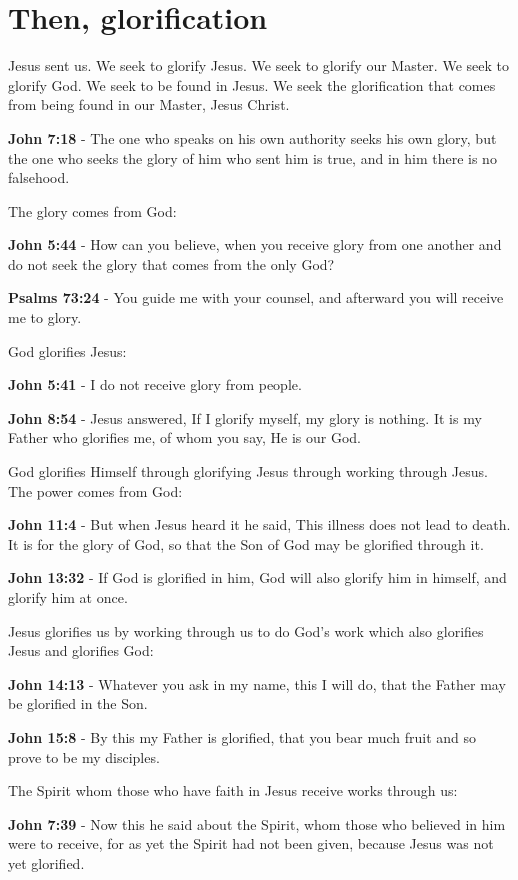 \documentclass[11pt]{article}
\begin{document}
\section{Then, glorification}
\label{sec:org25fc561}
Jesus sent us. We seek to glorify Jesus. We seek to glorify our Master.
We seek to glorify God. We seek to be found in Jesus. We seek the glorification that comes from being found in our Master, Jesus Christ.

\textbf{John 7:18} - The one who speaks on his own authority seeks his own glory, but the one who seeks the glory of him who sent him is true, and in him there is no falsehood.

The glory comes from God:

\textbf{John 5:44} - How can you believe, when you receive glory from one another and do not seek the glory that comes from the only God?

\textbf{Psalms 73:24} - You guide me with your counsel, and afterward you will receive me to glory.

God glorifies Jesus:

\textbf{John 5:41} - I do not receive glory from people.

\textbf{John 8:54} - Jesus answered, If I glorify myself, my glory is nothing. It is my Father who glorifies me, of whom you say, He is our God.

God glorifies Himself through glorifying Jesus through working through Jesus. The power comes from God:

\textbf{John 11:4} - But when Jesus heard it he said, This illness does not lead to death. It is for the glory of God, so that the Son of God may be glorified through it.

\textbf{John 13:32} - If God is glorified in him, God will also glorify him in himself, and glorify him at once.

Jesus glorifies us by working through us to do God's work which also glorifies Jesus and glorifies God:

\textbf{John 14:13} - Whatever you ask in my name, this I will do, that the Father may be glorified in the Son.

\textbf{John 15:8} - By this my Father is glorified, that you bear much fruit and so prove to be my disciples.

The Spirit whom those who have faith in Jesus receive works through us:

\textbf{John 7:39} - Now this he said about the Spirit, whom those who believed in him were to receive, for as yet the Spirit had not been given, because Jesus was not yet glorified.
\end{document}
